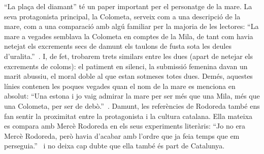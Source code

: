 ``La plaça del diamant'' té un paper important per el personatge de la mare.
La seva protagonista principal, la Colometa, serveix com a una descripció de la mare, com a una comparació amb algú familiar per la majoria de les lectores:
``La mare a vegades semblava la Colometa en comptes de la Mila, de tant com havia netejat els excrements secs de damunt els taulons de fusta sota les deules d'uralita.''~\autocite[199]{ElHachmi2008}.
I, de fet, trobarem trets similars entre les dues (apart de netejar els excrements de coloms): el patiment en silenci, la submissió femenina davan un marit abussiu, el moral doble al que estan sotmeses totes dues.
Demés, aquestes línies contenen les poques vegades quan el nom de la mare es menciona en absolut:
``Una estona i jo vaig admirar la mare per ser més que una Mila, més que una Colometa, per ser de debò.''~\autocite[223]{ElHachmi2008}.
Damunt, les referències de Rodoreda també ens fan sentir la proximitat entre la protagonista i la cultura catalana.
Ella mateixa es compara amb Mercè Rodoreda en els seus experiments literàris: ``Jo no era Mercè Rodoreda, però havia d'acabar amb l'ordre que ja feia temps que em perseguia.''~\autocite[331]{ElHachmi2008} i no deixa cap dubte que ella també és part de Catalunya.

